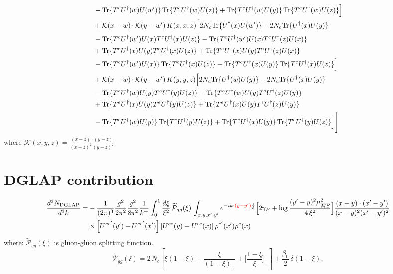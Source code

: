 \documentclass[9pt]{article}
\numberwithin{equation}{section}
\newcommand{\ph}[1]{{\color{red}#1}}
\begin{document}
\begin{align}
&-{\rm Tr}\{T^eU^\dagger(w)U(w')\}\,{\rm Tr}\{T^eU^\dagger(w)U(z)\}+{\rm Tr}\{T^eU^\dagger(w)U(y)\}\,{\rm Tr}\{T^eU^\dagger(w)U(z)\}\Big]\notag\\
&+\mathcal K(x-w)\cdot\mathcal K(y-w')\,K(x,x,z)\Big[2 N_{c}{\rm Tr}\{U^\dagger(x)U(w')\}-2 N_{c}{\rm Tr}\{U^\dagger(x)U(y)\}\notag\\
&-{\rm Tr}\{T^eU^\dagger(w')U(x)T^eU^\dagger(x)U(z)\}-{\rm Tr}\{T^eU^\dagger(w')U(x)T^eU^\dagger(z)U(x)\}\notag\\
&+{\rm Tr}\{T^eU^\dagger(x)U(y)T^eU^\dagger(x)U(z)\}+{\rm Tr}\{T^eU^\dagger(x)U(y)T^eU^\dagger(z)U(x)\}\notag\\
&-{\rm Tr}\{T^eU^\dagger(w')U(x)\}\,{\rm Tr}\{T^eU^\dagger(x)U(z)\}-{\rm Tr}\{T^eU^\dagger(x)U(y)\}\,{\rm Tr}\{T^eU^\dagger(x)U(z)\}\Big]\notag\\
&+\mathcal K(x-w)\cdot\mathcal K(y-w')\,K(y,y,z)\Big[2 N_{c}{\rm Tr}\{U^\dagger(w)U(y)\}-2 N_{c}{\rm Tr}\{U^\dagger(x)U(y)\}\notag\\
&-{\rm Tr}\{T^eU^\dagger(w)U(y)T^eU^\dagger(y)U(z)\}-{\rm Tr}\{T^eU^\dagger(w)U(y)T^eU^\dagger(z)U(y)\}\notag\\
&+{\rm Tr}\{T^eU^\dagger(x)U(y)T^eU^\dagger(y)U(z)\}+{\rm Tr}\{T^eU^\dagger(x)U(y)T^eU^\dagger(z)U(y)\}\notag\\
&-{\rm Tr}\{T^eU^\dagger(w)U(y)\}\,{\rm Tr}\{T^eU^\dagger(y)U(z)\}+{\rm Tr}\{T^eU^\dagger(x)U(y)\}\,{\rm Tr}\{T^eU^\dagger(y)U(z)\}\Big]\Bigg]
\end{align}
where $\mathcal{K}(x,y,z) = \frac{(x-z)\cdot (y-z)}{(x-z)^{2}\,(y-z)^{2}}$
\section{DGLAP contribution}
\begin{align}
\frac{d^{3}N_{\rm DGLAP}}{d^{3}k}= &-\frac{1}{(2\pi)^{3}}\frac{g^{2}}{2\pi^{2}}\frac{g^{2}}{8\pi^{2}}\frac{1}{k^{+}}\int_{0}^{1}\frac{d\xi}{\xi^{2}}\,\widetilde{\mathcal P}_{gg}(\xi)\,\int_{x,y,x',y'}e^{-ik\cdot\ph{(y-y')}\frac{1}{\xi}}\Big[2\gamma_{E}+\log\frac{(y'-y)^{2}\mu^{2}_{\overline{MS}}}{4\,\xi^{2}}\Big]\frac{(x-y)\cdot(x'-y')}{(x-y)^{2}(x'-y')^{2}}\notag\\
&\times\left[U^{ce'}(y') - U^{ce'}(x')\right]\left[U^{ce}(y) - U^{ce}(x)\right]\rho^{e'}(x')\rho^{e}(x)
\end{align}
where:
$\widetilde{\mathcal{P}}_{gg}(\xi)$ is gluon-gluon splitting function.
$$\widetilde{\mathcal{P}}_{gg}(\xi) = 2\,N_{c}\left[\xi(1-\xi) + \frac{\xi}{(1-\xi)_{+}} + \Big[\frac{1-\xi}{\xi}\Big]_{+}\right]+\frac{\beta_{0}}{2}\,\delta(1-\xi),$$
\end{document}
